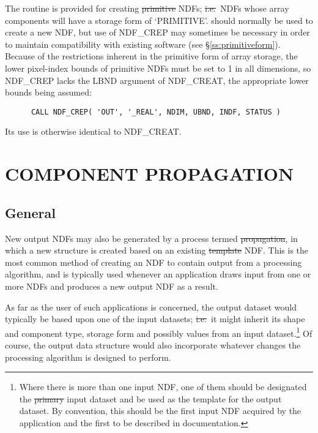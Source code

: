 The routine  is provided for creating
\st{primitive\/} NDFs; \st{i.e.}\ NDFs whose array components will
have a storage form of `PRIMITIVE'. 
 should normally be used to create a new NDF, but use of NDF\_CREP
may sometimes be necessary in order to maintain compatibility with existing
software (see \S\ref{ss:primitiveform}). 
Because of the restrictions inherent in the primitive form of array storage,
the lower pixel-index bounds of primitive NDFs must be set to 1 in all
dimensions, so NDF\_CREP lacks the LBND argument of NDF\_CREAT, the
appropriate lower bounds being assumed: 

\small
\begin{verbatim}
      CALL NDF_CREP( 'OUT', '_REAL', NDIM, UBND, INDF, STATUS )
\end{verbatim}
\normalsize

Its use is otherwise identical to NDF\_CREAT.


\section{\label{ss:propagate}COMPONENT PROPAGATION}

\subsection{General}

New output NDFs may also be generated by a process termed \st{propagation},
in which a new structure is created based on an existing \st{template\/} NDF.
This is the most common method of creating an NDF to contain output from a
processing algorithm, and is typically used whenever an application draws
input from one or more NDFs and produces a new output NDF as a result. 

As far as the user of such applications is concerned, the output dataset
would typically be based upon one of the input datasets; \st{i.e.}\ it might
inherit its shape and component type, storage form and possibly values from
an input dataset.\footnote{Where there is more than one input NDF, one of
them should be designated the \st{primary\/} input dataset and be used as the
template for the output dataset. By convention, this should be the first
input NDF acquired by the application and the first to be described in
documentation.} 
Of course, the output data structure would also incorporate whatever changes
the processing algorithm is designed to perform. 

